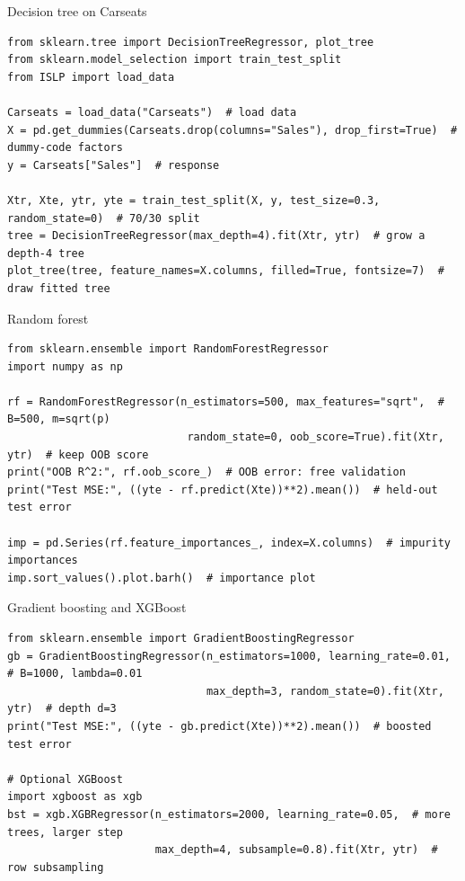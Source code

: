 \documentclass[aspectratio=169,11pt]{beamer}
\begin{document}

\begin{frame}[fragile]{Decision tree on Carseats}
  \begin{lstlisting}[basicstyle=\ttfamily\scriptsize]
from sklearn.tree import DecisionTreeRegressor, plot_tree
from sklearn.model_selection import train_test_split
from ISLP import load_data

Carseats = load_data("Carseats")  # load data
X = pd.get_dummies(Carseats.drop(columns="Sales"), drop_first=True)  # dummy-code factors
y = Carseats["Sales"]  # response

Xtr, Xte, ytr, yte = train_test_split(X, y, test_size=0.3, random_state=0)  # 70/30 split
tree = DecisionTreeRegressor(max_depth=4).fit(Xtr, ytr)  # grow a depth-4 tree
plot_tree(tree, feature_names=X.columns, filled=True, fontsize=7)  # draw fitted tree
  \end{lstlisting}
\end{frame}

\begin{frame}[fragile]{Random forest}
  \begin{lstlisting}[basicstyle=\ttfamily\scriptsize]
from sklearn.ensemble import RandomForestRegressor
import numpy as np

rf = RandomForestRegressor(n_estimators=500, max_features="sqrt",  # B=500, m=sqrt(p)
                            random_state=0, oob_score=True).fit(Xtr, ytr)  # keep OOB score
print("OOB R^2:", rf.oob_score_)  # OOB error: free validation
print("Test MSE:", ((yte - rf.predict(Xte))**2).mean())  # held-out test error

imp = pd.Series(rf.feature_importances_, index=X.columns)  # impurity importances
imp.sort_values().plot.barh()  # importance plot
  \end{lstlisting}
\end{frame}

\begin{frame}[fragile]{Gradient boosting and XGBoost}
  \begin{lstlisting}[basicstyle=\ttfamily\scriptsize]
from sklearn.ensemble import GradientBoostingRegressor
gb = GradientBoostingRegressor(n_estimators=1000, learning_rate=0.01,  # B=1000, lambda=0.01
                               max_depth=3, random_state=0).fit(Xtr, ytr)  # depth d=3
print("Test MSE:", ((yte - gb.predict(Xte))**2).mean())  # boosted test error

# Optional XGBoost
import xgboost as xgb
bst = xgb.XGBRegressor(n_estimators=2000, learning_rate=0.05,  # more trees, larger step
                       max_depth=4, subsample=0.8).fit(Xtr, ytr)  # row subsampling
  \end{lstlisting}
\end{frame}
\end{document}
